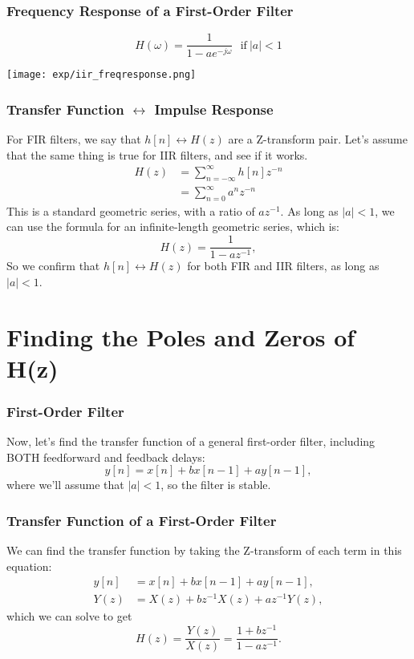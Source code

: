 \documentclass{beamer}
\begin{document}
\begin{frame}
  \frametitle{Frequency Response of a  First-Order Filter}
  \[
  H(\omega) = \frac{1}{1-ae^{-j\omega}}~~~\mbox{if}~|a|<1
  \]
  
  \centerline{\texttt{[image: exp/iir\_freqresponse.png]}}
\end{frame}

\begin{frame}
  \frametitle{Transfer Function $\leftrightarrow$ Impulse Response}

  For FIR filters, we say that $h[n]\leftrightarrow H(z)$ are a
  Z-transform pair.  Let's assume that the same thing is true for IIR
  filters, and see if it works.
  \begin{align*}
    H(z) &= \sum_{n=-\infty}^\infty h[n] z^{-n}\\
    &= \sum_{n=0}^\infty a^n z^{-n} 
  \end{align*}
  This is a standard geometric series, with a ratio of $az^{-1}$.  As
  long as $|a|<1$, we can use the formula for an infinite-length
  geometric series, which is:
  \[
  H(z) = \frac{1}{1-az^{-1}},
  \]
  So we confirm that $h[n]\leftrightarrow H(z)$ for both FIR and IIR
  filters, as long as $|a|<1$.
\end{frame}

\section[Poles and Zeros]{Finding the Poles and Zeros of H(z)}
\setcounter{subsection}{1}

\begin{frame}
  \frametitle{First-Order Filter}

  Now, let's find the transfer function of a general first-order filter, including BOTH
  feedforward and feedback delays:
  \[
  y[n] = x[n] + bx[n-1] + ay[n-1],
  \]
  where we'll assume that $|a|<1$, so the filter is stable.  
\end{frame}

\begin{frame}
  \frametitle{Transfer Function of a First-Order Filter}

  We can find the transfer function by taking the Z-transform of each
  term in this equation:
  \begin{align*}
    y[n] &= x[n] + bx[n-1] + ay[n-1],\\
    Y(z) &= X(z)+bz^{-1}X(z)+az^{-1} Y(z),
  \end{align*}
  which we can solve to get
  \[
  H(z)  = \frac{Y(z)}{X(z)} = \frac{1+bz^{-1}}{1-az^{-1}}.
  \]
\end{frame}
\end{document}
